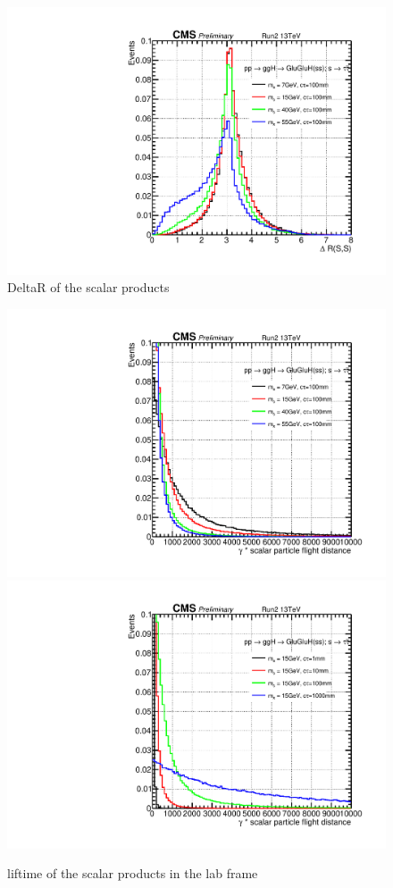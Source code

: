 \begin{figure}[h!]
  \caption{DeltaR of the scalar products}
  \label{fig:scalarpt}
  \centering
  \includegraphics[width=0.5\linewidth]{figs/Scalar_dR100mm.pdf}
\end{figure}

\begin{figure}[h!]
  \caption{liftime of the scalar products in the lab frame}
  \label{fig:scalarpt}
  \centering
  \includegraphics[width=0.57\linewidth]{figs/Scalar_gammactau100mm.pdf}
  \includegraphics[width=0.57\linewidth]{figs/Scalar_gammactau15GeV.pdf}
\end{figure}

